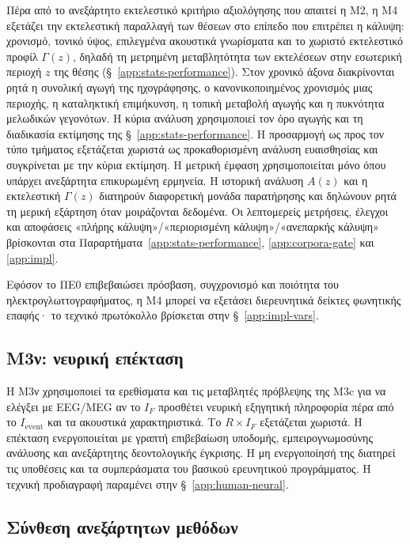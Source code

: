 \documentclass[11pt,a4paper]{article}
\begin{document}
Πέρα από το ανεξάρτητο εκτελεστικό κριτήριο αξιολόγησης που απαιτεί η M2, η M4 εξετάζει την εκτελεστική παραλλαγή των θέσεων στο επίπεδο που επιτρέπει η κάλυψη: χρονισμό, τονικό ύψος, επιλεγμένα ακουστικά γνωρίσματα και το χωριστό εκτελεστικό προφίλ $\Gamma(z)$, δηλαδή τη μετρημένη μεταβλητότητα των εκτελέσεων στην εσωτερική περιοχή $z$ της θέσης (§~\ref{app:stats-performance}). Στον χρονικό άξονα διακρίνονται ρητά η συνολική αγωγή της ηχογράφησης, ο κανονικοποιημένος χρονισμός μιας περιοχής, η καταληκτική επιμήκυνση, η τοπική μεταβολή αγωγής και η πυκνότητα μελωδικών γεγονότων. Η κύρια ανάλυση χρησιμοποιεί τον όρο αγωγής και τη διαδικασία εκτίμησης της §~\ref{app:stats-performance}. Η προσαρμογή ως προς τον τύπο τμήματος εξετάζεται χωριστά ως προκαθορισμένη ανάλυση ευαισθησίας και συγκρίνεται με την κύρια εκτίμηση. Η μετρική έμφαση χρησιμοποιείται μόνο όπου υπάρχει ανεξάρτητα επικυρωμένη ερμηνεία. Η ιστορική ανάλυση $A(z)$ και η εκτελεστική $\Gamma(z)$ διατηρούν διαφορετική μονάδα παρατήρησης και δηλώνουν ρητά τη μερική εξάρτηση όταν μοιράζονται δεδομένα. Οι λεπτομερείς μετρήσεις, έλεγχοι και αποφάσεις «πλήρης κάλυψη»/«περιορισμένη κάλυψη»/«ανεπαρκής κάλυψη» βρίσκονται στα Παραρτήματα~\ref{app:stats-performance}, \ref{app:corpora-gate} και \ref{app:impl}.

Εφόσον το ΠΕ0 επιβεβαιώσει πρόσβαση, συγχρονισμό και ποιότητα του ηλεκτρογλωττογραφήματος, η M4 μπορεί να εξετάσει διερευνητικά δείκτες φωνητικής επαφής· το τεχνικό πρωτόκολλο βρίσκεται στην §~\ref{app:impl-vars}.

\subsection{M3ν: νευρική επέκταση}\label{sec:m3nu}

Η M3ν χρησιμοποιεί τα ερεθίσματα και τις μεταβλητές πρόβλεψης της M3c για να ελέγξει με EEG/MEG αν το $I_F$ προσθέτει νευρική εξηγητική πληροφορία πέρα από το $I_{\mathrm{event}}$ και τα ακουστικά χαρακτηριστικά. Το $R\times I_F$ εξετάζεται χωριστά. Η επέκταση ενεργοποιείται με γραπτή επιβεβαίωση υποδομής, εμπειρογνωμοσύνης ανάλυσης και ανεξάρτητης δεοντολογικής έγκρισης. Η μη ενεργοποίησή της διατηρεί τις υποθέσεις και τα συμπεράσματα του βασικού ερευνητικού προγράμματος. Η τεχνική προδιαγραφή παραμένει στην §~\ref{app:human-neural}.

\subsection{Σύνθεση ανεξάρτητων μεθόδων}
\end{document}
